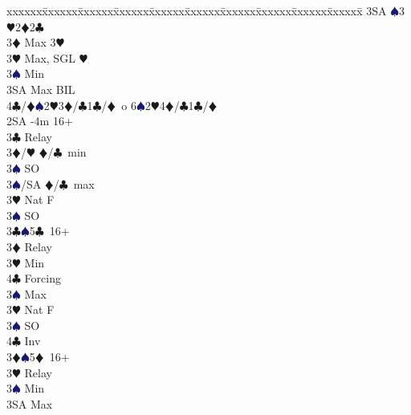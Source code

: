 \documentclass[a4paper,italian]{article}
\newcommand{\BC}{\textcolor{OliveGreen}{$\clubsuit$}}
\newcommand{\BD}{\textcolor{RedOrange}{$\vardiamondsuit$}}
\newcommand{\BH}{\textcolor{Red2}{$\varheartsuit${}}}
\newcommand{\BS}{\textcolor{MidnightBlue}{$\spadesuit${}}}
\newenvironment{bidtable}
{\begin{tabbing}

    xxxxxx\=xxxxxx\=xxxxxx\=xxxxxx\=xxxxxx\=xxxxxx\=xxxxxx\=xxxxxx\=xxxxxx\=xxxxxx\=\kill}
{\end{tabbing} }%
\begin{document}
\begin{multicols}{2}
\begin{bidtable}
                                            3SA \BS3\BH2\BD2\BC \-\-\\
                                            3\BD \> Max 3\BH \\
                                            3\BH \> Max, SGL \BH\\
                                            3\BS \> Min\\
                                            3SA \> Max BIL\\
                                            4\BC/\BD {}\BS2\BH3\BD/\BC1\BC/\BD\ o 6\BS2\BH4\BD/\BC1\BC/\BD\-\-\\
                                            2SA -4m 16+\+\\
                                            3\BC \> Relay\+\\
                                            3\BD/\BH \> \BD /\BC\ min\+\\
                                            3\BS \> SO\-\\
                                            3\BS/SA \> \BD /\BC\ max\-\\
                                            3\BH \> Nat F\\
                                            3\BS \> SO\-\\
                                            3\BC {}\BS 5\BC\ 16+\+\\
                                            3\BD \> Relay\+\\
                                            3\BH \> Min\+\\
                                            4\BC \> Forcing\-\\
                                            3\BS \> Max\-\\
                                            3\BH \> Nat F\\
                                            3\BS \> SO\\
                                            4\BC \> Inv\-\\
                                            3\BD {}\BS 5\BD\ 16+\+\\
                                            3\BH \> Relay\+\\
                                            3\BS \> Min\\
                                            3SA \> Max\-\\

\end{bidtable}
\end{multicols}
\end{document}
